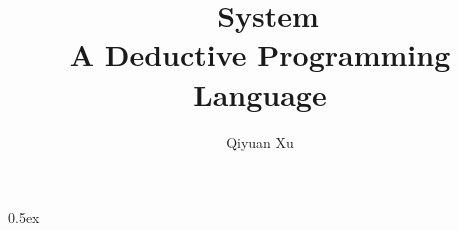 \documentclass[12pt,a4paper,fleqn]{article}
\begin{document}
\title{\xphi~System\\
A Deductive Programming Language}
\author{Qiyuan Xu}
\maketitle

\parindent 0pt\parskip 0.5ex



%
%
\end{document}
